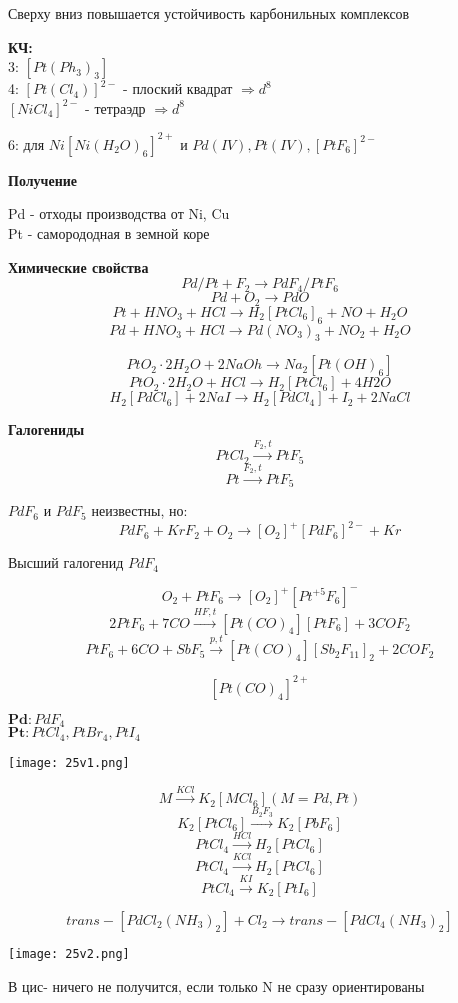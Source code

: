 Сверху вниз повышается устойчивость карбонильных комплексов

\textbf{КЧ:}\\
3: $[Pt(Ph_3)_3]$\\
4:  $[Pt(Cl_4)]^{2-}$ - плоский квадрат $\Rightarrow d^8$\\
$[NiCl_4]^{2-}$ - тетраэдр $\Rightarrow d^8$

6: для $Ni[Ni(H_2O)_6]^{2+}$ и $Pd(IV), Pt(IV), [PtF_6]^{2-}$

\textbf{Получение}

Pd - отходы производства от Ni, Cu\\
Pt - саморододная в земной коре

\textbf{Химические свойства}\\
$$Pd/Pt + F_2 \rightarrow PdF_4 / PtF_6$$
$$Pd + O_2 \rightarrow PdO$$
$$Pt + HNO_3 + HCl \rightarrow H_2[PtCl_6]_6 + NO + H_2O$$
$$Pd + HNO_3 + HCl \rightarrow Pd(NO_3)_3 + NO_2 + H_2O$$

$$PtO_2\cdot 2H_2O + 2NaOh \rightarrow Na_2[Pt(OH)_6]$$
$$PtO_2\cdot 2H_2O  + HCl \rightarrow H_2[PtCl_6] + 4H2O$$
$$H_2[PdCl_6] + 2NaI \rightarrow H_2[PdCl_4] + I_2 + 2NaCl$$

\textbf{Галогениды}
$$PtCl_2 \xrightarrow{F_2, t} PtF_5$$
$$Pt \xrightarrow{F_2,t} PtF_5$$

$PdF_6$ и $PdF_5$ неизвестны, но:
$$PdF_6 + KrF_2 + O_2 \rightarrow  [O_2]^+[PdF_6]^{2-} + Kr$$

Высший галогенид $PdF_4$

$$O_2 + PtF_6 \rightarrow [O_2]^+[Pt^{+5}F_6]^-$$
$$2PtF_6 + 7CO \xrightarrow{HF, t} [Pt(CO)_4][PtF_6] + 3COF_2$$
$$PtF_6 + 6CO + SbF_5  \xrightarrow{p,t} [Pt(CO)_4][Sb_2F_{11}]_2 + 2COF_2$$

$$[Pt(CO)_4]^{2+}$$


$\textbf{Pd} : PdF_4$\\
$\textbf{Pt} : PtCl_4, PtBr_4, PtI_4$

\texttt{[image: 25v1.png]}

$$M \xrightarrow{KCl} K_2[MCl_6] (M = Pd, Pt)$$
$$K_2[PtCl_6] \xrightarrow{B_2F_3} K_2[PbF_6]$$
$$PtCl_4 \xrightarrow{HCl} H_2[PtCl_6]$$
$$PtCl_4 \xrightarrow{KCl} H_2[PtCl_6]$$
$$PtCl_4 \xrightarrow{KI} K_2[PtI_6]$$

$$trans-[PdCl_2(NH_3)_2] + Cl_2 \rightarrow trans-[PdCl_4(NH_3)_2]$$

\texttt{[image: 25v2.png]}

В цис- ничего не получится, если только N не сразу ориентированы

